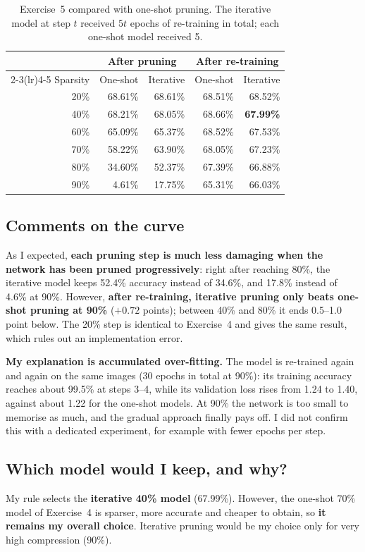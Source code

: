 \documentclass[11pt,a4paper]{article}
\begin{document}
\begin{table}[H]
\centering
\caption{Exercise~5 compared with one-shot pruning. The iterative model at step $t$ received $5t$ epochs of re-training in total; each one-shot model received 5.}
\label{tab:ex5}
\begin{tabular}{rrrrr}
\toprule
 & \multicolumn{2}{c}{After pruning} & \multicolumn{2}{c}{After re-training} \\
\cmidrule(lr){2-3}\cmidrule(lr){4-5}
Sparsity & One-shot & Iterative & One-shot & Iterative \\
\midrule
20\% & 68.61\% & 68.61\% & 68.51\% & 68.52\% \\
40\% & 68.21\% & 68.05\% & 68.66\% & \textbf{67.99\%} \\
60\% & 65.09\% & 65.37\% & 68.52\% & 67.53\% \\
70\% & 58.22\% & 63.90\% & 68.05\% & 67.23\% \\
80\% & 34.60\% & 52.37\% & 67.39\% & 66.88\% \\
90\% & 4.61\% & 17.75\% & 65.31\% & 66.03\% \\
\bottomrule
\end{tabular}
\end{table}

\subsection{Comments on the curve}
As I expected, \textbf{each pruning step is much less damaging when the network has been pruned progressively}: right after reaching 80\%, the iterative model keeps 52.4\% accuracy instead of 34.6\%, and 17.8\% instead of 4.6\% at 90\%. However, \textbf{after re-training, iterative pruning only beats one-shot pruning at 90\%} ($+0.72$ points); between 40\% and 80\% it ends 0.5--1.0 point below. The 20\% step is identical to Exercise~4 and gives the same result, which rules out an implementation error.

\textbf{My explanation is accumulated over-fitting.} The model is re-trained again and again on the same images (30 epochs in total at 90\%): its training accuracy reaches about 99.5\% at steps 3--4, while its validation loss rises from 1.24 to 1.40, against about 1.22 for the one-shot models. At 90\% the network is too small to memorise as much, and the gradual approach finally pays off. I did not confirm this with a dedicated experiment, for example with fewer epochs per step.

\subsection{Which model would I keep, and why?}
My rule selects the \textbf{iterative 40\% model} (67.99\%). However, the one-shot 70\% model of Exercise~4 is sparser, more accurate and cheaper to obtain, so \textbf{it remains my overall choice}. Iterative pruning would be my choice only for very high compression (90\%).
\end{document}
